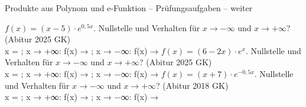\begin{aufgabe}{Produkte aus Polynom und e-Funktion – Prüfungsaufgaben – weiter}
\begin{teile}
\teil $f(x) = (x - 5) \cdot e^{0{,}5x}$. Nullstelle und Verhalten für $x \to -\infty$ und $x \to +\infty$? \hfill (Abitur 2025 GK) \\ x = \leerfeld ; x → +∞: f(x) → \leerfeld ; x → −∞: f(x) → \leerfeld
\teil $f(x) = (6 - 2x) \cdot e^{x}$. Nullstelle und Verhalten für $x \to -\infty$ und $x \to +\infty$? \hfill (Abitur 2025 GK) \\ x = \leerfeld ; x → +∞: f(x) → \leerfeld ; x → −∞: f(x) → \leerfeld
\teil $f(x) = (x + 7) \cdot e^{-0{,}5x}$. Nullstelle und Verhalten für $x \to -\infty$ und $x \to +\infty$? \hfill (Abitur 2018 GK) \\ x = \leerfeld ; x → +∞: f(x) → \leerfeld ; x → −∞: f(x) → \leerfeld
\end{teile}
\end{aufgabe}
